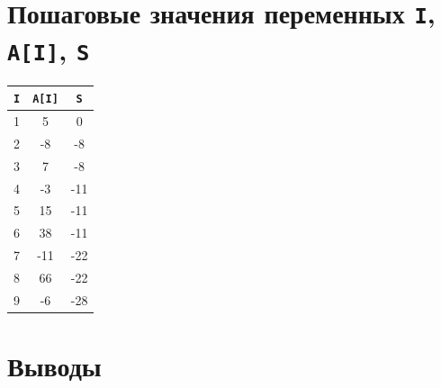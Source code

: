 \documentclass[ru, listings]{labreport}
\begin{document}


\section*{Пошаговые значения переменных \texttt{I}, \texttt{A[I]}, \texttt{S}}

\begin{tabular}{|c|c|c|}
  \hline
  \verb|I| & \verb|A[I]| & \verb|S| \\\hline
  1 & 5 & 0 \\
  2 & -8 & -8 \\
  3 & 7 & -8 \\
  4 & -3 & -11 \\
  5 & 15 & -11 \\
  6 & 38 & -11 \\
  7 & -11 & -22 \\
  8 & 66 & -22 \\
  9 & -6 & -28 \\\hline
\end{tabular}

\section*{Выводы}
\end{document}
